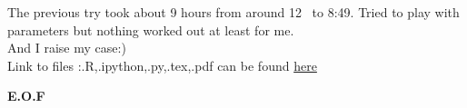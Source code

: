 \documentclass{article}
\begin{document}
The previous try took about 9 hours from around 12~ to 8:49.
Tried to play with parameters but nothing worked out at least for me.\\ And I raise my case:)\\
Link to files :.R,.ipython,.py,.tex,.pdf can be found \href{https://github.com/aqeel13932/DM/tree/master/HW07}{here}
\begin{center}
\textbf{E.O.F}
\end{center}
\end{document}
